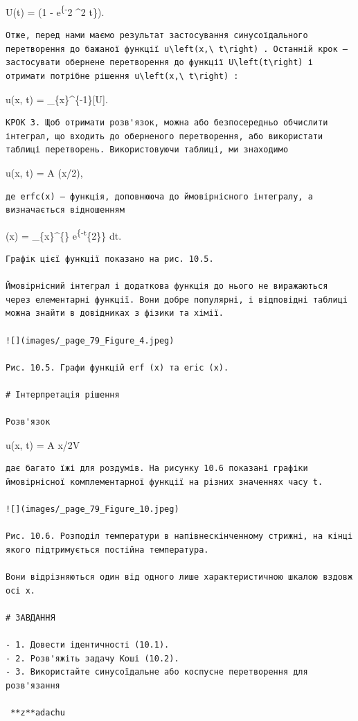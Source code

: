 \documentclass[
  ukrainian,
]{article}
\begin{document}
U(t) =  (1 - e\textsuperscript{\{-\omega}2
\alpha\^{}2 t\}).

\begin{verbatim}
Отже, перед нами маємо результат застосування синусоїдального перетворення до бажаної функції u\left(x,\ t\right) . Останній крок — застосувати обернене перетворення до функції U\left(t\right) і отримати потрібне рішення u\left(x,\ t\right) :
\end{verbatim}

u(x, t) = \_\{x\}\^{}\{-1\}{[}U{]}.

\begin{verbatim}
КРОК 3. Щоб отримати розв'язок, можна або безпосередньо обчислити інтеграл, що входить до оберненого перетворення, або використати таблиці перетворень. Використовуючи таблиці, ми знаходимо
\end{verbatim}

u(x, t) = A (x/2\alpha {}),

\begin{verbatim}
де erfc(x) — функція, доповнююча до ймовірнісного інтегралу, а визначається відношенням
\end{verbatim}

(x) =  \int\_\{x\}\^{}\{\infty\}
e\textsuperscript{\{-t}\{2\}\} dt.

\begin{verbatim}
Графік цієї функції показано на рис. 10.5.

Ймовірнісний інтеграл і додаткова функція до нього не виражаються через елементарні функції. Вони добре популярні, і відповідні таблиці можна знайти в довідниках з фізики та хімії.

![](images/_page_79_Figure_4.jpeg)

Рис. 10.5. Графи функцій erf (x) та eric (x).

# Інтерпретація рішення

Розв'язок
\end{verbatim}

u(x, t) = A \operatorname{erfc}{[}x/2\alpha V \overline{t}{]}

\begin{verbatim}
дає багато їжі для роздумів. На рисунку 10.6 показані графіки ймовірнісної комплементарної функції на різних значеннях часу t.

![](images/_page_79_Figure_10.jpeg)

Рис. 10.6. Розподіл температури в напівнескінченному стрижні, на кінці якого підтримується постійна температура.

Вони відрізняються один від одного лише характеристичною шкалою вздовж осі x.

# ЗАВДАННЯ

- 1. Довести ідентичності (10.1).
- 2. Розв'яжіть задачу Коші (10.2).
- 3. Використайте синусоїдальне або коспусне перетворення для розв'язання

 **z**adachu
\end{verbatim}
\end{document}
